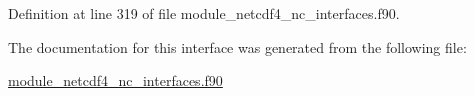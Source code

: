 Definition at line 319 of file module\+\_\+netcdf4\+\_\+nc\+\_\+interfaces.\+f90.



The documentation for this interface was generated from the following file\+:\begin{DoxyCompactItemize}
\item 
\hyperlink{module__netcdf4__nc__interfaces_8f90}{module\+\_\+netcdf4\+\_\+nc\+\_\+interfaces.\+f90}\end{DoxyCompactItemize}

